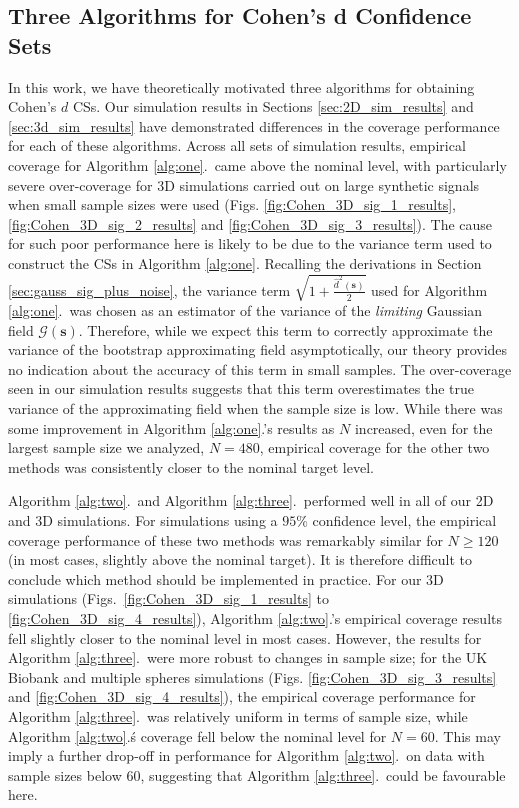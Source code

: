 \subsection{Three Algorithms for Cohen's d Confidence Sets}
In this work, we have theoretically motivated three algorithms for obtaining Cohen's $d$ CSs. Our simulation results in Sections \ref{sec:2D_sim_results} and \ref{sec:3d_sim_results} have demonstrated differences in the coverage performance for each of these algorithms. Across all sets of simulation results, empirical coverage for Algorithm \ref{alg:one}.\ came above the nominal level, with particularly severe over-coverage for 3D simulations carried out on large synthetic signals when small sample sizes were used (Figs. \ref{fig:Cohen_3D_sig_1_results}, \ref{fig:Cohen_3D_sig_2_results} and \ref{fig:Cohen_3D_sig_3_results}). The cause for such poor performance here is likely to be due to the variance term used to construct the CSs in Algorithm \ref{alg:one}. Recalling the derivations in Section \ref{sec:gauss_sig_plus_noise}, the variance term $\sqrt{1 + \frac{\hat{d}^{2}(\bm{s})}{2}}$ used for Algorithm \ref{alg:one}.\ was chosen as an estimator of the variance of the \textit{limiting} Gaussian field $\mathcal{G}(\bm{s})$. Therefore, while we expect this term to correctly approximate the variance of the bootstrap approximating field asymptotically, our theory provides no indication about the accuracy of this term in small samples. The over-coverage seen in our simulation results suggests that this term overestimates the true variance of the approximating field when the sample size is low. While there was some improvement in Algorithm \ref{alg:one}.'s results as $N$ increased, even for the largest sample size we analyzed, $N = 480$, empirical coverage for the other two methods was consistently closer to the nominal target level. 

Algorithm \ref{alg:two}.\ and Algorithm \ref{alg:three}.\ performed well in all of our 2D and 3D simulations. For simulations using a $95\%$ confidence level, the empirical coverage performance of these two methods was remarkably similar for $N \geq 120$ (in most cases, slightly above the nominal target). It is therefore difficult to conclude which method should be implemented in practice. For our 3D simulations (Figs.\ \ref{fig:Cohen_3D_sig_1_results} to \ref{fig:Cohen_3D_sig_4_results}), Algorithm \ref{alg:two}.'s empirical coverage results fell slightly closer to the nominal level in most cases. However, the results for Algorithm \ref{alg:three}.\ were more robust to changes in sample size; for the UK Biobank and multiple spheres simulations (Figs. \ref{fig:Cohen_3D_sig_3_results} and \ref{fig:Cohen_3D_sig_4_results}), the empirical coverage performance for Algorithm \ref{alg:three}.\ was relatively uniform in terms of sample size, while Algorithm \ref{alg:two}.\'s coverage fell below the nominal level for $N = 60$. This may imply a further drop-off in performance for Algorithm \ref{alg:two}.\ on data with sample sizes below 60, suggesting that Algorithm \ref{alg:three}.\ could be favourable here. 


